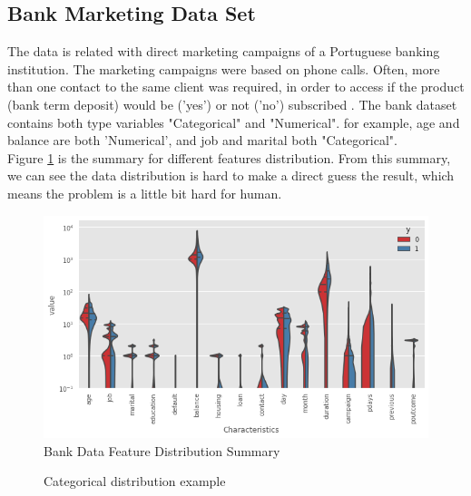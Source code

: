 \documentclass[10pt, conference, compsocconf]{IEEEtran}
\begin{document}
\subsection[]{Bank Marketing Data Set}
The data is related with direct marketing campaigns of a Portuguese banking institution. The marketing campaigns were based on phone calls. Often, more than one contact to the same client was required, in order to access if the product (bank term deposit) would be ('yes') or not ('no') subscribed \cite{bank}.
The bank dataset contains both type variables "Categorical" and "Numerical". for example, age and balance are both 'Numerical', and job and marital both "Categorical".\\
Figure \ref{fig:bankSummary} is the summary for different features distribution. From this summary, we can see the data distribution is hard to make a direct guess the result, which means the problem is a little bit hard for human. 
\begin{figure}[h]
	\includegraphics[scale = 0.4]{image/bankSummary.png}
	\caption{Bank Data Feature Distribution Summary}
	\label{fig:bankSummary}
\end{figure}
\begin{figure}[h]
	\hfill
	\centering
	\hfill
	\hfill
	\caption{Categorical distribution example}
	\label{fig:3}
	
\end{figure}
\end{document}
